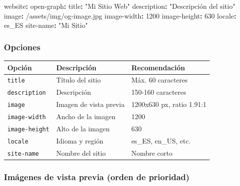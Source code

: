 \documentclass[
  doc,
  floatsintext,
  longtable,
  a4paper,
  nolmodern,
  notxfonts,
  notimes,
  12pt,
  colorlinks=true,linkcolor=blue,citecolor=blue,urlcolor=blue]{apa7}
\newenvironment{Shaded}{\begin{snugshade}}{\end{snugshade}}
\newcommand{\AttributeTok}[1]{\textcolor[rgb]{0.40,0.45,0.13}{#1}}
\newcommand{\DecValTok}[1]{\textcolor[rgb]{0.68,0.00,0.00}{#1}}
\newcommand{\FunctionTok}[1]{\textcolor[rgb]{0.28,0.35,0.67}{#1}}
\newcommand{\KeywordTok}[1]{\textcolor[rgb]{0.00,0.23,0.31}{\textbf{#1}}}
\newcommand{\StringTok}[1]{\textcolor[rgb]{0.13,0.47,0.30}{#1}}
\newcounter{none} %
\begin{document}
\begin{Shaded}
\begin{Highlighting}[]
\FunctionTok{website}\KeywordTok{:}
\AttributeTok{  }\FunctionTok{open{-}graph}\KeywordTok{:}
\AttributeTok{    }\FunctionTok{title}\KeywordTok{:}\AttributeTok{ }\StringTok{"Mi Sitio Web"}
\AttributeTok{    }\FunctionTok{description}\KeywordTok{:}\AttributeTok{ }\StringTok{"Descripción del sitio"}
\AttributeTok{    }\FunctionTok{image}\KeywordTok{:}\AttributeTok{ /assets/img/og{-}image.jpg}
\AttributeTok{    }\FunctionTok{image{-}width}\KeywordTok{:}\AttributeTok{ }\DecValTok{1200}
\AttributeTok{    }\FunctionTok{image{-}height}\KeywordTok{:}\AttributeTok{ }\DecValTok{630}
\AttributeTok{    }\FunctionTok{locale}\KeywordTok{:}\AttributeTok{ es\_ES}
\AttributeTok{    }\FunctionTok{site{-}name}\KeywordTok{:}\AttributeTok{ }\StringTok{"Mi Sitio"}
\end{Highlighting}
\end{Shaded}

\subsubsection{Opciones}\label{opciones}

{\def\LTcaptype{none} %
\begin{longtable}[]{@{}lll@{}}
\toprule\noalign{}
Opción & Descripción & Recomendación \\
\midrule\noalign{}
\endhead
\bottomrule\noalign{}
\endlastfoot
\texttt{title} & Título del sitio & Máx. 60 caracteres \\
\texttt{description} & Descripción & 150-160 caracteres \\
\texttt{image} & Imagen de vista previa & 1200x630 px, ratio 1.91:1 \\
\texttt{image-width} & Ancho de la imagen & 1200 \\
\texttt{image-height} & Alto de la imagen & 630 \\
\texttt{locale} & Idioma y región & es\_ES, en\_US, etc. \\
\texttt{site-name} & Nombre del sitio & Nombre corto \\
\end{longtable}
}

\subsubsection{Imágenes de vista previa (orden de
prioridad)}\label{imuxe1genes-de-vista-previa-orden-de-prioridad}
\end{document}
